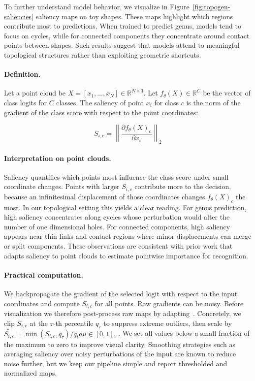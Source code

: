 To further understand model behavior, we visualize in Figure~\ref{fig:topogen-saliencies} saliency maps on toy shapes. These maps highlight which regions contribute most to predictions. When trained to predict genus, models tend to focus on cycles, while for connected components they concentrate around contact points between shapes. Such results suggest that models attend to meaningful topological structures rather than exploiting geometric shortcuts.

\paragraph{Definition.}
Let a point cloud be $X=[x_1,\dots,x_N] \in \mathbb{R}^{N\times 3}$. Let $f_\theta(X)\in\mathbb{R}^C$ be the vector of class logits for $C$ classes. The saliency of point $x_i$ for class $c$ is the norm of the gradient of the class score with respect to the point coordinates:

\begin{equation}
  S_{i,c} = \left\| \frac{\partial f_\theta(X)_c}{\partial x_i} \right\|_2
\end{equation}

\paragraph{Interpretation on point clouds.}
Saliency quantifies which points most influence the class score under small coordinate changes. Points with larger $S_{i,c}$ contribute more to the decision, because an infinitesimal displacement of those coordinates changes $f_\theta(X)_c$ the most. In our topological setting this yields a clear reading. For genus prediction, high saliency concentrates along cycles whose perturbation would alter the number of one dimensional holes. For connected components, high saliency appears near thin links and contact regions where minor displacements can merge or split components. These observations are consistent with prior work that adapts saliency to point clouds to estimate pointwise importance for recognition.

\paragraph{Practical computation.}
We backpropagate the gradient of the selected logit with respect to the input coordinates and compute $S_{i,c}$ for all points. Raw gradients can be noisy. Before visualization we therefore post-process raw maps by adapting~\cite{smoothgrad}. Concretely, we clip $S_{i,c}$ at the $\tau$-th percentile $q_\tau$ to suppress extreme outliers, then scale by $\tilde{S_{i,c}} = \min(S_{i,c},q_\tau)/q_tau \in [0,1]$. . We set all values below a small fraction of the maximum to zero to improve visual clarity. Smoothing strategies such as averaging saliency over noisy perturbations of the input are known to reduce noise further, but we keep our pipeline simple and report thresholded and normalized maps.

